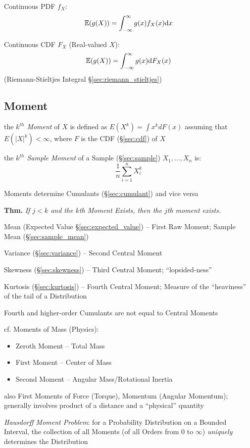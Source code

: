 Continuous PDF $f_X$:
\[
  \mathbb{E}(g(X)) = \int_{-\infty}^\infty g(x) f_X(x) \mathrm{d}x
\]

Continuous CDF $F_X$ (Real-valued $X$):
\[
  \mathbb{E}(g(X)) = \int_{-\infty}^\infty g(x) \mathrm{d}F_X(x)
\]
(Riemann-Stieltjes Integral \S\ref{sec:riemann_stieltjes})



\subsection{Moment}\label{sec:moment}

the \emph{$k^{th}$ Moment} of $X$ is defined as $E(X^k) = \int x^k dF(x)$
assuming that $E(|X|^k) < \infty$, where $F$ is the CDF (\S\ref{sec:cdf}) of $X$

the \emph{$k^{th}$ Sample Moment} of a Sample (\S\ref{sec:sample})
$X_1, \ldots, X_n$ is:
\[
  \frac{1}{n}\sum_{i=1}^n X^k_{i}
\]

Moments determine Cumulants (\S\ref{sec:cumulant}) and vice versa

\textbf{Thm.} \emph{If $j < k$ and the $k$th Moment Exists, then the $j$th
  moment exists.}

Mean (Expected Value \S\ref{sec:expected_value}) -- First Raw Moment; Sample
Mean (\S\ref{sec:sample_mean})

Variance (\S\ref{sec:variance}) -- Second Central Moment

Skewness (\S\ref{sec:skewness}) -- Third Central Moment; ``lopsided-ness''

Kurtosis (\S\ref{sec:kurtosis}) -- Fourth Central Moment; Measure of the
``heaviness'' of the tail of a Distribution

Fourth and higher-order Cumulants are not equal to Central Moments

cf. Moments of Mass (Physics):
\begin{itemize}
  \item Zeroth Moment -- Total Mass
  \item First Moment -- Center of Mass
  \item Second Moment -- Angular Mass/Rotational Inertia
\end{itemize}
also First Moments of Force (Torque), Momentum (Angular Momentum); generally
involves product of a distance and a ``physical'' quantity

\emph{Hausdorff Moment Problem}: for a Probability Distribution on a Bounded
Interval, the collection of all Moments (of all Orders from $0$ to $\infty$)
\emph{uniquely} determines the Distribution

